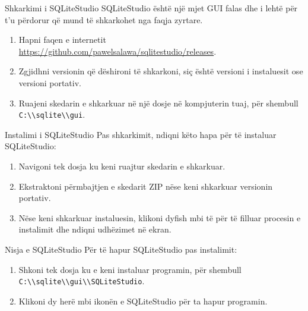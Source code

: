 \documentclass[
  ignorenonframetext,
]{beamer}
\begin{document}
\begin{frame}[fragile]{Shkarkimi i SQLiteStudio}
\label{shkarkimi-i-sqlitestudio}
SQLiteStudio është një mjet GUI falas dhe i lehtë për t'u përdorur që
mund të shkarkohet nga faqja zyrtare.

\begin{enumerate}
\item
  Hapni faqen e internetit
  \url{https://github.com/pawelsalawa/sqlitestudio/releases}.
\item
  Zgjidhni versionin që dëshironi të shkarkoni, siç është versioni i
  instaluesit ose versioni portativ.
\item
  Ruajeni skedarin e shkarkuar në një dosje në kompjuterin tuaj, për
  shembull
  \texttt{C:\textbackslash{}\textbackslash{}sqlite\textbackslash{}\textbackslash{}gui}.
\end{enumerate}
\end{frame}

\begin{frame}{Instalimi i SQLiteStudio}
\label{instalimi-i-sqlitestudio}
Pas shkarkimit, ndiqni këto hapa për të instaluar SQLiteStudio:

\begin{enumerate}
\item
  Navigoni tek dosja ku keni ruajtur skedarin e shkarkuar.
\item
  Ekstraktoni përmbajtjen e skedarit ZIP nëse keni shkarkuar versionin
  portativ.
\item
  Nëse keni shkarkuar instaluesin, klikoni dyfish mbi të për të filluar
  procesin e instalimit dhe ndiqni udhëzimet në ekran.
\end{enumerate}
\end{frame}

\begin{frame}[fragile]{Nisja e SQLiteStudio}
\label{nisja-e-sqlitestudio}
Për të hapur SQLiteStudio pas instalimit:

\begin{enumerate}
\item
  Shkoni tek dosja ku e keni instaluar programin, për shembull
  \texttt{C:\textbackslash{}\textbackslash{}sqlite\textbackslash{}\textbackslash{}gui\textbackslash{}\textbackslash{}SQLiteStudio}.
\item
  Klikoni dy herë mbi ikonën e SQLiteStudio për ta hapur programin.
\end{enumerate}
\end{frame}
\end{document}
